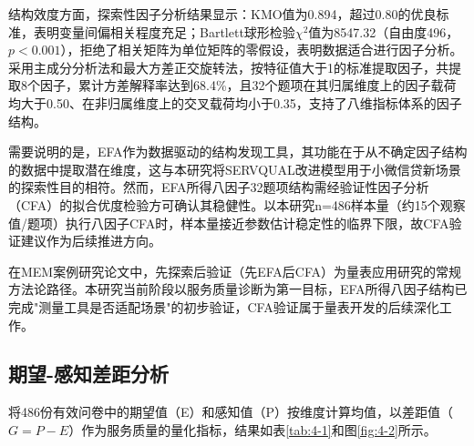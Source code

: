 结构效度方面，探索性因子分析结果显示：KMO值为0.894，超过0.80的优良标准，表明变量间偏相关程度充足；Bartlett球形检验$\chi^2$值为8547.32（自由度496，$p < 0.001$），拒绝了相关矩阵为单位矩阵的零假设，表明数据适合进行因子分析。采用主成分分析法和最大方差正交旋转法，按特征值大于1的标准提取因子，共提取8个因子，累计方差解释率达到68.4\%，且32个题项在其归属维度上的因子载荷均大于0.50、在非归属维度上的交叉载荷均小于0.35，支持了八维指标体系的因子结构。\par

需要说明的是，EFA作为数据驱动的结构发现工具，其功能在于从不确定因子结构的数据中提取潜在维度，这与本研究将SERVQUAL改进模型用于小微信贷新场景的探索性目的相符。然而，EFA所得八因子32题项结构需经验证性因子分析（CFA）的拟合优度检验方可确认其稳健性。以本研究n=486样本量（约15个观察值/题项）执行八因子CFA时，样本量接近参数估计稳定性的临界下限，故CFA验证建议作为后续推进方向。\par
在MEM案例研究论文中，先探索后验证（先EFA后CFA）为量表应用研究的常规方法论路径。本研究当前阶段以服务质量诊断为第一目标，EFA所得八因子结构已完成"测量工具是否适配场景"的初步验证，CFA验证属于量表开发的后续深化工作。\par

\subsection{期望-感知差距分析}

将486份有效问卷中的期望值（E）和感知值（P）按维度计算均值，以差距值（$G = P - E$）作为服务质量的量化指标，结果如表\ref{tab:4-1}和图\ref{fig:4-2}所示。\par

\begin{table}[htbp]
  \centering
  \small
  \caption{各维度期望-感知差距分析}
  \label{tab:4-1}
\end{table}

